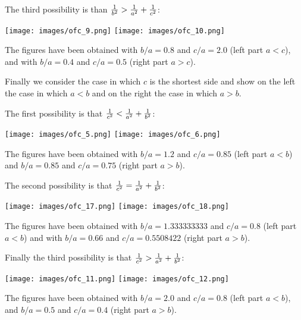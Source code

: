 \documentclass[12pt,a4paper]{article}
\begin{document}
The third possibility is than ${1\over b^2}>{1\over a^2} + {1\over c^2}$:
\begin{center}
\texttt{[image: images/ofc\_9.png]} \hspace{1cm}
\texttt{[image: images/ofc\_10.png]} 
\end{center}
The figures have been obtained with $b/a=0.8$ and $c/a=2.0$ (left part $a<c$),
and with $b/a=0.4$ and $c/a=0.5$ (right part $a>c$).

Finally we consider the case in which $c$ is the shortest side and show on
the left the case in which $a<b$ and on the right the case in which $a>b$. 

The first possibility is that ${1\over c^2}<{1\over a^2} + {1\over b^2}$:
\begin{center}
\texttt{[image: images/ofc\_5.png]} \hspace{1cm}
\texttt{[image: images/ofc\_6.png]} 
\end{center}
The figures have been obtained with $b/a=1.2$ and $c/a=0.85$ (left part $a<b$)
and $b/a=0.85$ and $c/a=0.75$ (right part $a>b$).

The second possibility is that ${1\over c^2}={1\over a^2} + {1\over b^2}$:
\begin{center}
\texttt{[image: images/ofc\_17.png]} \hspace{1cm}
\texttt{[image: images/ofc\_18.png]} 
\end{center}
The figures have been obtained with $b/a=1.333333333$ and $c/a=0.8$ 
(left part $a<b$) and with $b/a=0.66$ and $c/a=0.5508422$ (right part
$a>b$).

Finally the third possibility is that 
${1\over c^2} >{1\over a^2} + {1\over b^2}$:
\begin{center}
\texttt{[image: images/ofc\_11.png]} \hspace{1cm}
\texttt{[image: images/ofc\_12.png]} 
\end{center}
The figures have been obtained with $b/a=2.0$ and $c/a=0.8$ (left part $a<b$),
and $b/a=0.5$ and $c/a=0.4$ (right part $a>b$).
\end{document}

